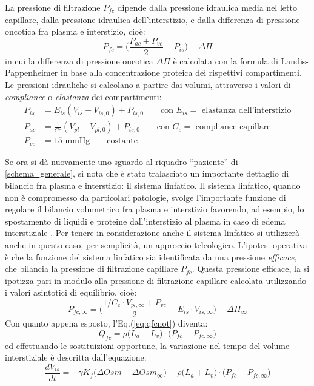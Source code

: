 La pressione di filtrazione $P_{fc}$ dipende dalla pressione idraulica media nel letto capillare, dalla pressione idraulica dell'interstizio, e dalla differenza di pressione oncotica fra plasma e interstizio, cioè:
\begin{equation}
	P_{fc} = \biggl(\frac{P_{ac}+P_{vc}}{2} - P_{is}\biggr) - \Delta \Pi
\end{equation}
in cui la differenza di pressione oncotica $\Delta \Pi$ è calcolata con la formula di Landis-Pappenheimer in base alla concentrazione proteica dei rispettivi compartimenti. Le pressioni idrauliche si calcolano a partire dai volumi, attraverso i valori di \textit{compliance} o \textit{elastanza} dei compartimenti:
\begin{align}
  P_{is} &= E_{is} (V_{is}-V_{is,0}) + P_{is,0} \qquad \text{con $E_{is}=$ elastanza dell'interstizio}\\
	P_{ac} &= \frac{1}{Cc} (V_{pl}-V_{pl,0}) + P_{is,0} \qquad \text{con $C_c=$ compliance capillare} \\
	P_{vc} &= 15\text{ mmHg} \qquad \text{costante}
\end{align}

Se ora si dà nuovamente uno sguardo al riquadro ``paziente'' di \figurename\ref{schema_generale}, si nota che è stato tralasciato un importante dettaglio di bilancio fra plasma e interstizio: il sistema linfatico. Il sistema linfatico, quando non è compromesso da particolari patologie, svolge l'importante funzione di regolare il bilancio volumetrico fra plasma e interstizio favorendo, ad esempio, lo spostamento di liquidi e proteine dall'interstizio al plasma in caso di edema interstiziale \cite{guyton}. Per tenere in considerazione anche il sistema linfatico si utilizzerà anche in questo caso, per semplicità, un approccio teleologico. L'ipotesi operativa è che la funzione del sistema linfatico sia identificata da una pressione \textit{efficace}, che bilancia la pressione di filtrazione capillare $P_{fc}$. Questa pressione efficace, la si ipotizza pari in modulo alla pressione di filtrazione capillare calcolata utilizzando i valori asintotici di equilibrio, cioè:
\begin{equation}
	P_{fc,\infty} = \biggl(\frac{1/C_c\cdot V_{pl,\infty} + P_{vc}}{2} - E_{is}\cdot V_{is,\infty}\biggr) - \Delta \Pi_{\infty}
\end{equation}
Con quanto appena esposto, l'Eq.(\ref{eq:qfcnot}) diventa:
\begin{equation}\label{eq:qfcyes}
	Q_{fc} =  \rho \bigl(L_a+L_v\bigr)\cdot \bigl(P_{fc}-P_{fc,\infty}\bigr)
\end{equation}
ed effettuando le sostituizioni opportune, la variazione nel tempo del volume interstiziale è descritta dall'equazione:
\begin{equation}\label{eq:dVis}
	\frac{dV_{is}}{dt} = - \gamma K_f \bigl(\Delta Osm - \Delta Osm_{\infty}\bigr) + \rho \bigl(L_a+L_v\bigr)\cdot \bigl(P_{fc}-P_{fc,\infty}\bigr)
\end{equation}


